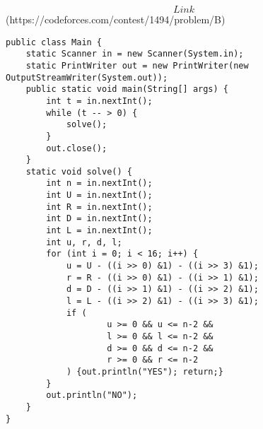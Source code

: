 \documentclass[a4paper,10pt]{article}
\begin{document}
\[Link\](https://codeforces.com/contest/1494/problem/B)
\newpage
\begin{lstlisting}
public class Main {
    static Scanner in = new Scanner(System.in);
    static PrintWriter out = new PrintWriter(new OutputStreamWriter(System.out));
    public static void main(String[] args) {
        int t = in.nextInt();
        while (t -- > 0) {
            solve();
        }
        out.close();
    }
    static void solve() {
        int n = in.nextInt();
        int U = in.nextInt();
        int R = in.nextInt();
        int D = in.nextInt();
        int L = in.nextInt();
        int u, r, d, l;
        for (int i = 0; i < 16; i++) {
            u = U - ((i >> 0) &1) - ((i >> 3) &1);
            r = R - ((i >> 0) &1) - ((i >> 1) &1);
            d = D - ((i >> 1) &1) - ((i >> 2) &1);
            l = L - ((i >> 2) &1) - ((i >> 3) &1);
            if (
                    u >= 0 && u <= n-2 &&
                    l >= 0 && l <= n-2 &&
                    d >= 0 && d <= n-2 &&
                    r >= 0 && r <= n-2
            ) {out.println("YES"); return;}
        }
        out.println("NO");
    }
}
\end{lstlisting}
\end{document}
